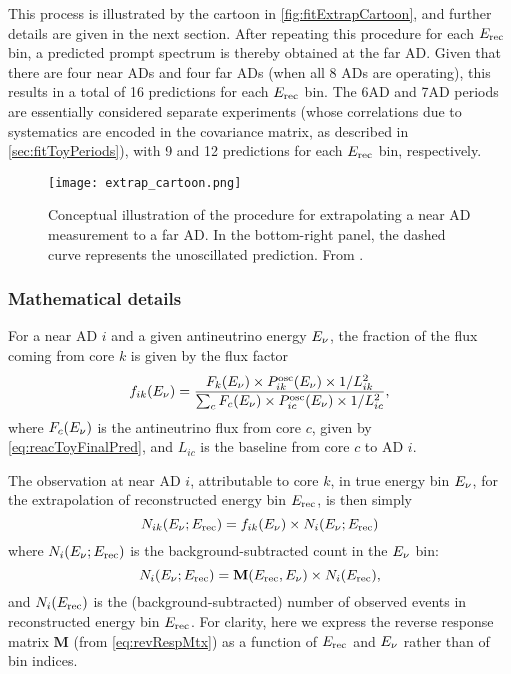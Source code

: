 \documentclass[../thesis.tex]{subfiles}
\begin{document}
This process is illustrated by the cartoon in \autoref{fig:fitExtrapCartoon}, and further details are given in the next section. After repeating this procedure for each $E_\mathrm{rec}$ bin, a predicted prompt spectrum is thereby obtained at the far AD. Given that there are four near ADs and four far ADs (when all 8 ADs are operating), this results in a total of 16 predictions for each $E_\mathrm{rec}$ bin. The 6AD and 7AD periods are essentially considered separate experiments (whose correlations due to systematics are encoded in the covariance matrix, as described in \autoref{sec:fitToyPeriods}), with 9 and 12 predictions for each $E_\mathrm{rec}$ bin, respectively.

\begin{figure}[ht]
  \centering
  \texttt{[image: extrap\_cartoon.png]}
  \caption{Conceptual illustration of the procedure for extrapolating a near AD measurement to a far AD. In the bottom-right panel, the dashed curve represents the unoscillated prediction. From \cite{berkeley_shapefit}.}
  \label{fig:fitExtrapCartoon} 
\end{figure}

\subsubsection{Mathematical details}

For a near AD $i$ and a given antineutrino energy $E_\mathrm{\nu}$, the fraction of the flux coming from core $k$ is given by the flux factor
\begin{equation}
  \label{eq:fitFluxFactor}
  f_{ik}(E_\mathrm{\nu}) = \frac{F_k(E_\mathrm{\nu}) \times P^{\mathrm{osc}}_{ik}(E_\mathrm{\nu}) \times 1/L^2_{ik}}
  {\sum_c F_c(E_\mathrm{\nu}) \times P^{\mathrm{osc}}_{ic}(E_\mathrm{\nu}) \times 1/L^2_{ic}},
\end{equation}
where $F_c(E_\mathrm{\nu})$ is the antineutrino flux from core $c$, given by \autoref{eq:reacToyFinalPred}, and $L_{ic}$ is the baseline from core $c$ to AD $i$.

The observation at near AD $i$, attributable to core $k$, in true energy bin $E_\mathrm{\nu}$, for the extrapolation of reconstructed energy bin $E_\mathrm{rec}$, is then simply
\begin{equation}
  N_{ik}(E_\mathrm{\nu}; E_\mathrm{rec}) = f_{ik}(E_\mathrm{\nu}) \times N_i(E_\mathrm{\nu}; E_\mathrm{rec})
\end{equation}
where $N_i(E_\mathrm{\nu}; E_\mathrm{rec})$ is the background-subtracted count in the $E_\mathrm{\nu}$ bin:
\begin{equation}
  N_i(E_\mathrm{\nu}; E_\mathrm{rec}) = \mathbf{M}(E_\mathrm{rec}, E_\mathrm{\nu}) \times N_i(E_\mathrm{rec}),
\end{equation}
and $N_i(E_\mathrm{rec})$ is the (background-subtracted) number of observed events in reconstructed energy bin $E_\mathrm{rec}$. For clarity, here we express the reverse response matrix $\mathbf{M}$ (from \autoref{eq:revRespMtx}) as a function of $E_\mathrm{rec}$ and $E_\mathrm{\nu}$ rather than of bin indices.
\end{document}
